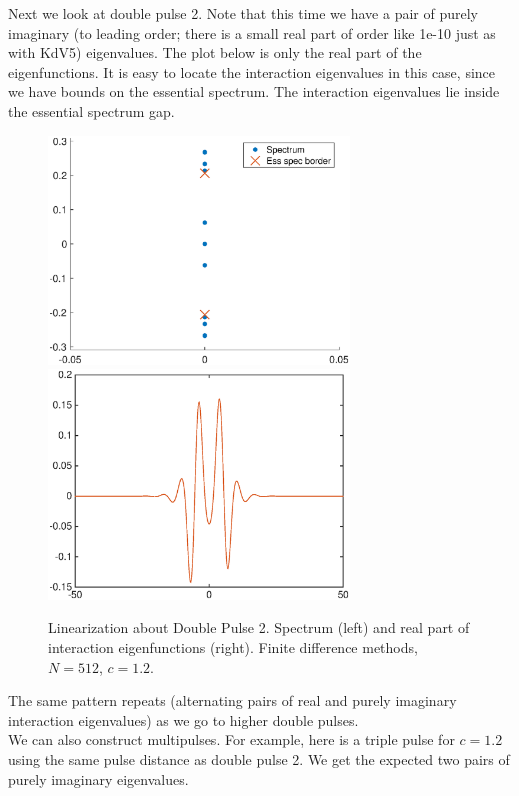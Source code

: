 \documentclass[12pt]{article}
\begin{document}
Next we look at double pulse 2. Note that this time we have a pair of purely imaginary (to leading order; there is a small real part of order like 1e-10 just as with KdV5) eigenvalues. The plot below is only the real part of the eigenfunctions. It is easy to locate the interaction eigenvalues in this case, since we have bounds on the essential spectrum. The interaction eigenvalues lie inside the essential spectrum gap.

\begin{figure}[H]
\centering
\includegraphics[width=8cm]{spec12_double2.eps}
\includegraphics[width=8cm]{evecs12_double2real.eps}
\caption{Linearization about Double Pulse 2. Spectrum (left) and real part of interaction eigenfunctions (right). Finite difference methods, $N = 512$, $c = 1.2$.}
\end{figure}

The same pattern repeats (alternating pairs of real and purely imaginary interaction eigenvalues) as we go to higher double pulses.\\

We can also construct multipulses. For example, here is a triple pulse for $c = 1.2$ using the same pulse distance as double pulse 2. We get the expected two pairs of purely imaginary eigenvalues.
\end{document}
